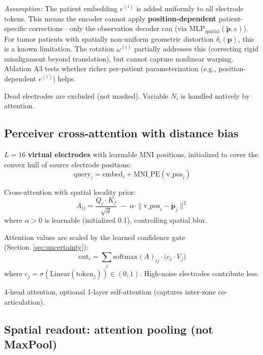 \documentclass[11pt,letterpaper]{article}
\newcommand{\assumption}[1]{\par\smallskip\noindent\textcolor{BrickRed}{\textit{Assumption:} #1}\smallskip}
\newcommand{\bfp}{\mathbf{p}}
\begin{document}
\assumption{The patient embedding $e^{(i)}$ is added uniformly to all electrode tokens. This means the encoder cannot apply \textbf{position-dependent} patient-specific corrections---only the observation decoder can (via $\text{MLP}_{\text{spatial}}(\tilde{\bfp}, e)$). For tumor patients with spatially non-uniform geometric distortion $\delta_i(\bfp)$, this is a known limitation. The rotation $\omega^{(i)}$ partially addresses this (correcting rigid misalignment beyond translation), but cannot capture nonlinear warping. Ablation A3 tests whether richer per-patient parameterization (e.g., position-dependent $e^{(i)}$) helps.}

Dead electrodes are excluded (not masked). Variable $N_i$ is handled natively by attention.

\subsection{Perceiver cross-attention with distance bias}

$L = 16$ \textbf{virtual electrodes} with learnable MNI positions, initialized to cover the convex hull of source electrode positions:
\begin{equation}
\text{query}_i = \text{embed}_i + \text{MNI\_PE}(\text{v\_pos}_i)
\end{equation}

Cross-attention with spatial locality prior:
\begin{equation}
\boxed{A_{ij} = \frac{Q_i \cdot K_j}{\sqrt{d}} \;-\; \alpha \cdot \|\text{v\_pos}_i - \tilde{\bfp}_j\|^2}
\end{equation}
where $\alpha > 0$ is learnable (initialized 0.1), controlling spatial blur.

Attention values are scaled by the learned confidence gate (Section~\ref{sec:uncertainty}):
\begin{equation}
\text{out}_i = \sum_j \text{softmax}(A)_{ij} \cdot \bigl(c_j \cdot V_j\bigr)
\end{equation}
where $c_j = \sigma(\text{Linear}(\text{token}_j)) \in (0,1)$. High-noise electrodes contribute less.

4-head attention, optional 1-layer self-attention (captures inter-zone co-articulation).

\subsection{Spatial readout: attention pooling (not MaxPool)}\label{sec:readout}
\end{document}
